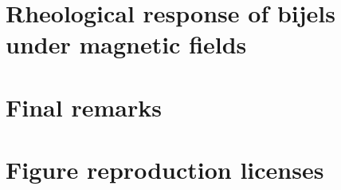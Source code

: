 \documentclass{udthesis}
\begin{document}
\chapter{Rheological response of bijels under magnetic fields}
\label{chapter:aim3}


\chapter{Final remarks}
\label{chapter:final_remarks}


\newpage

\chapter{Figure reproduction licenses}


\newpage



\end{document}
